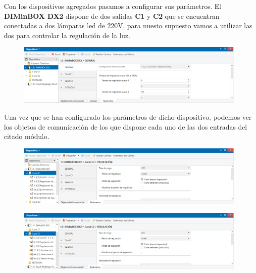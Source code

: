 \documentclass[10pt]{article}
\begin{document}
Con los dispositivos agregados pasamos a configurar sus parámetros. El  \textbf{DIMinBOX DX2} dispone de dos salidas \textbf{C1} y \textbf{C2} que se encuentran conectadas a dos lámparas led de 220V, para nuesto supuesto vamos a utilizar las dos para controlar la regulación de la luz. \\

\begin{figure}[H]
	\begin{center}
	 		\includegraphics[width = 1.00\textwidth]{Imagenes/img3}
	\end{center} 
\end{figure}

Una vez que se han configurado los parámetros de dicho dispositivo, podemos ver los objetos de comunicación de los que dispone cada uno de las dos entradas del citado módulo. \\

\begin{figure}[H]
	\begin{center}
	 		\includegraphics[width = 1.00\textwidth]{Imagenes/img4}
	\end{center} 
\end{figure}

\begin{figure}[H]
	\begin{center}
	 		\includegraphics[width = 1.00\textwidth]{Imagenes/img5}
	\end{center} 
\end{figure}
\end{document}
